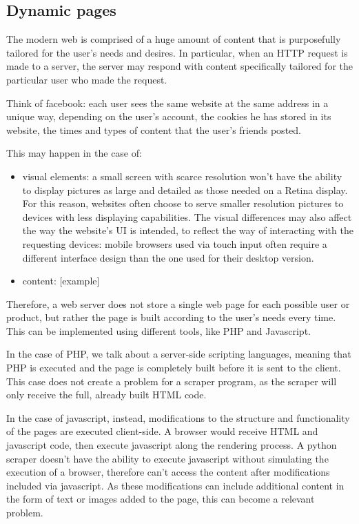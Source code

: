 \documentclass[LaM,binding=0.6cm]{sapthesis}
\begin{document}
\subsection{Dynamic pages}

The modern web is comprised of a huge amount of content that is purposefully tailored for the user's needs and desires. In particular, when an HTTP request is made to a server, the server may respond with content specifically tailored for the particular user who made the request.

Think of facebook: each user sees the same website at the same address in a unique way, depending on the user's account, the cookies he has stored in its website, the times and types of content that the user's friends posted.

This may happen in the case of:

\begin{itemize}
	\item visual elements: a small screen with scarce resolution won't have the ability to display pictures as large and detailed as those needed on a Retina display. For this reason, websites often choose to serve smaller resolution pictures to devices with less displaying capabilities. The visual differences may also affect the way the website's UI is intended, to reflect the way of interacting with the requesting devices: mobile browsers used via touch input often require a different interface design than the one used for their desktop version.
	\item content: [example]
\end{itemize}

Therefore, a web server does not store a single web page for each possible user or product, but rather the page is built according to the user's needs every time.
This can be implemented using different tools, like PHP and Javascript.

In the case of PHP, we talk about a server-side scripting languages, meaning that PHP is executed and the page is completely built before it is sent to the client. This case does not create a problem for a scraper program, as the scraper will only receive the full, already built HTML code.

In the case of javascript, instead, modifications to the structure and functionality of the pages are executed client-side. A browser would receive HTML and javascript code, then execute javascript along the rendering process. A python scraper doesn't have the ability to execute javascript without simulating the execution of a browser, therefore can't access the content after modifications included via javascript. As these modifications can include additional content in the form of text or images added to the page, this can become a relevant problem.
\end{document}
